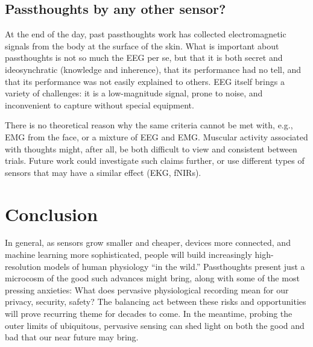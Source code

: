 \documentclass[sigconf]{acmart}
\begin{document}
\subsection{Passthoughts by any other sensor?}
\label{sec:orgf9630d1}

At the end of the day, past passthoughts work has collected electromagnetic signals from the body at the surface of the skin.
What is important about passthoughts is not so much the EEG per se, but that it is both secret and ideosynchratic (knowledge and inherence), that its performance had no tell, and that its performance was not easily explained to others.
EEG itself brings a variety of challenges: it is a low-magnitude signal, prone to noise, and inconvenient to capture without special equipment.

There is no theoretical reason why the same criteria cannot be met with, e.g., EMG from the face, or a mixture of EEG and EMG.
Muscular activity associated with thoughts might, after all, be both difficult to view and consistent between trials.
Future work could investigate such claims further, or use different types of sensors that may have a similar effect (EKG, fNIRs).

\section{Conclusion}
\label{sec:org3cc930b}

In general, as sensors grow smaller and cheaper, devices more connected, and machine learning more sophisticated, 
people will build increasingly high-resolution models of human physiology ``in the wild.''
Passthoughts present just a microcosm of the good such advances might bring, 
along with some of the most pressing anxieties: 
What does pervasive physiological recording mean for our privacy, security, safety? 
The balancing act between these risks and opportunities will prove recurring theme for decades to come.
In the meantime, probing the outer limits of ubiquitous, pervasive sensing can shed light on both the good and bad that our near future may bring.
\cite{Gaver1999}




\end{document}
